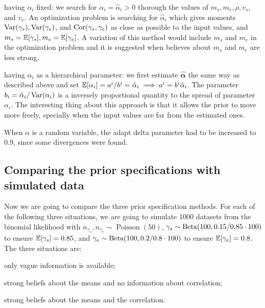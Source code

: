 \begin{alineas}
  \item having $\alpha_i$ fixed: we search for $\alpha_i = \hat{\alpha}_i >
    0$ thorough the values of $m_s, m_e, \rho, v_s$, and $v_e$. An optimization
  problem is searching for $\hat{\alpha}_i$ which gives moments
  $\operatorname{Var}(\gamma_s), \operatorname{Var}(\gamma_e)$, and $\operatorname{Cor}(\gamma_s, \gamma_e)$ as close as
  possible to the input values, and $m_s = \mathbb{E}[\gamma_s], m_e =
    \mathbb{E}[\gamma_e]$. A variation of this method would include $m_s$ and $m_e$ in
  the optimization problem and it is suggested when believes about $m_s$ and
  $m_e$ are less strong.
  \item having $\alpha_i$ as a hierarchical parameter: we first estimate
  $\hat{\boldsymbol{\alpha}}$ the same way as described above and set
  $\mathbb{E}[\alpha_i] = a^i/b^i = \hat{\alpha}_i \implies a^i = b^i\hat{\alpha}_i$.
  The parameter $b_i = \hat{\alpha}_i/\operatorname{Var}(\alpha_i)$ is a inversely
  proportional quantity to the spread of parameter $\alpha_i$. The interesting
  thing about this approach is that it allows the prior to move more freely,
  specially when the input values are far from the estimated ones.
\end{alineas}

\begin{remark}
  When $\alpha$ is a random variable, the adapt delta parameter had to be
  increased to 0.9, since some divergences were found.
\end{remark}

\subsection{Comparing the prior specifications with simulated data}

Now we are going to compare the three prior specification methods. For each of
the following three situations, we are going to simulate 1000 datasets from
the binomial likelihood with $n_{\gamma_s}, n_{\gamma_e} \sim
  \operatorname{Poisson}(50)$, $\gamma_s \sim \operatorname{Beta}(100, 0.15/0.85 \cdot
  100)$ to ensure $\mathbb{E}[\gamma_s] = 0.85$, and  $\gamma_e \sim \operatorname{Beta}(100, 0.2/0.8 \cdot
  100)$ to ensure $\mathbb{E}[\gamma_e] = 0.8$. The three situations are:

\begin{alineas}
  \item \label{item:vague-information-sensitivity-specificity} only vague information is available;
  \item \label{item:strong-mean-sensitivity-specificity} strong beliefs about the means and no information about correlation;
  \item\label{item:strong-mean-cor-information-sensitivity-specificity}  strong beliefs about the means and the correlation.
\end{alineas}

